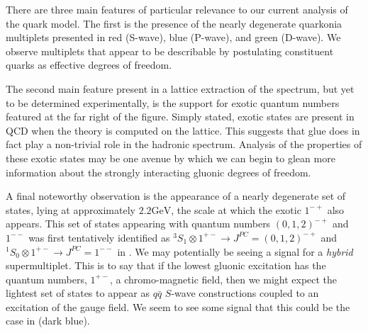 There are three main features of particular relevance to our current analysis of the quark model. The first is the presence of the nearly degenerate quarkonia multiplets presented in red (S-wave), blue (P-wave), and green (D-wave). We observe multiplets that appear to be describable by postulating constituent quarks as effective degrees of freedom. 

The second main feature present in a lattice extraction of the spectrum, but yet to be determined experimentally, is the support for exotic quantum numbers featured at the far right of the figure. Simply stated, exotic states are present in QCD when the theory is computed on the lattice. This suggests that glue does in fact play a non-trivial role in the hadronic spectrum. Analysis of the properties of these exotic states may be one avenue by which we can begin to glean more information about the strongly interacting gluonic degrees of freedom. 



A final noteworthy observation is the appearance of a nearly degenerate set of states, lying at approximately $2.2\mathrm{GeV}$, the scale at which the exotic $1^{-+}$ also appears. This set of states appearing with quantum numbers $(0,1,2)^{-+}$ and $1^{--}$ was first tentatively identified as $^3S_1 \otimes 1^{+-}\rightarrow J^{PC} = (0,1,2)^{-+}$ and $^1S_0\otimes 1^{+-} \rightarrow J^{PC} = 1^{--}$ in \cite{Dudek:2011bn}. We may potentially be seeing a signal for a \emph{hybrid} supermultiplet. This is to say that if the lowest gluonic excitation has the quantum numbers, $1^{+-}$, a chromo-magnetic field, then we might expect the lightest set of states to appear as $q\bar{q}$ $S$-wave constructions coupled to an excitation of the gauge field. We seem to see some signal that this could be the case in  (dark blue). 

